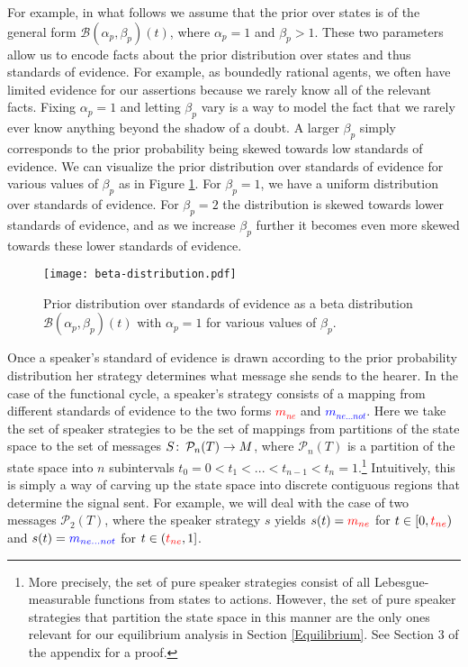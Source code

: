 \documentclass[linguex]{sp}
\theoremstyle{definition} \newtheorem{definition}{Definition}
\begin{document}
For example, in what follows we assume that the prior over states is of the general form $\mathcal{B}(\alpha_p,\beta_p)(t)$, where $\alpha_p = 1$ and $\beta_p > 1$. These two parameters allow us to encode facts about the prior distribution over states and thus standards of evidence. For example, as boundedly rational agents, we often have limited evidence for our assertions because we rarely know all of the relevant facts. Fixing $\alpha_p=1$ and letting $\beta_p$ vary is a way to model the fact that we rarely ever know anything beyond the shadow of a doubt.  A larger $\beta_p$ simply corresponds to the prior probability being skewed towards low standards of evidence.  We can visualize the prior distribution over standards of evidence for various values of $\beta_p$ as in Figure \ref{beta}. For $\beta_p = 1$, we have a uniform distribution over standards of evidence. For $\beta_p = 2$ the distribution is skewed towards lower standards of evidence, and as we increase $\beta_p$ further it becomes even more skewed towards these lower standards of evidence. 

\begin{figure}
\begin{center}
	\texttt{[image: beta-distribution.pdf]}
	\caption{Prior distribution over standards of evidence as a beta distribution $\mathcal{B}(\alpha_p, \beta_p)(t)$  with $\alpha_p = 1$ for various values of $\beta_p$.}
	\label{beta}
\end{center}
\end{figure}

Once a speaker's standard of evidence is drawn according to the prior probability distribution her strategy determines what message she sends to the hearer. In the case of the functional cycle, a speaker's strategy consists of a mapping from different standards of evidence to the two forms \emph{\textcolor{red}{$m_{ne}$}} and \emph{\textcolor{blue}{$m_{ne...not}$}}.  Here we take the set of speaker strategies to be the set of mappings from partitions of the state space to the set of messages $S \colon\thinspace \mathcal{P}_n(T) \rightarrow M$, where $\mathcal{P}_n(T)$ is a partition of the state space into $n$ subintervals $t_0 = 0 < t_1 < ... < t_{n-1} < t_n = 1$.\footnote{More precisely, the set of pure speaker strategies consist of all Lebesgue-measurable functions from states to actions. However, the set of pure speaker strategies that partition the state space in this manner are the only ones relevant for our equilibrium analysis in Section \ref{Equilibrium}. See Section 3 of the appendix for a proof.}  Intuitively, this is simply a way of carving up the state space into discrete contiguous regions that determine the signal sent.  For example, we will deal with the case of two messages $\mathcal{P}_2(T)$, where the speaker  strategy $s$ yields $s(t) = \textcolor{red}{m_{ne}}$ for $t \in [0, \emph{\textcolor{red}{$t_{ne}$}})$ and $s(t) = \textcolor{blue}{m_{ne...not}}$  for $t \in (\emph{\textcolor{red}{$t_{ne}$}}, 1]$.  
\end{document}
